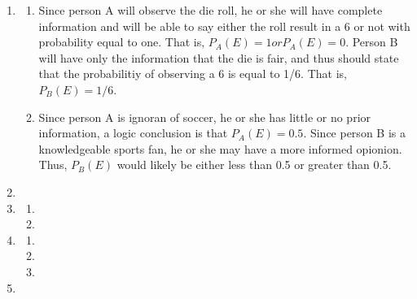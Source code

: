 \documentclass[12pt]{article}\usepackage[]{graphicx}\usepackage[]{color}
\begin{document}
\begin{enumerate}
\item
\begin{enumerate}
\item Since person A will observe the die roll, he or she will have complete information and will be able to say either the roll result in a 6 or not with probability equal to one. That is, $P_A(E)=1 or P_A(E)=0$. Person B will have only the information that the die is fair, and thus should state that the probabilitiy of observing a 6 is equal to 1/6. That is, $P_B(E)=1/6$.
\item Since person A is ignoran of soccer, he or she has little or no prior information, a logic conclusion is that $P_A(E)=0.5$. Since person B is a knowledgeable sports fan, he or she may have a more informed opionion. Thus, $P_B(E)$ would likely be either less than 0.5 or greater than 0.5.
\end{enumerate}
\item
\item
\begin{enumerate}
\item
\item
\end{enumerate}
\item
\begin{enumerate}
\item
\item
\item
\end{enumerate}
\item
\end{enumerate}
\end{document}
